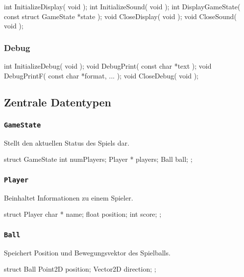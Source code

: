 \documentclass{homework-pp}
\renewcommand{\c}[1]{\lstinline[language=c,basicstyle=\ttfamily]|#1|}
\begin{document}
\begin{cblock}
int InitializeDisplay( void );
int InitializeSound( void );
int DisplayGameState( const struct GameState *state );
void CloseDisplay( void );
void CloseSound( void );
\end{cblock}

\subsubsection{Debug}

\begin{cblock}
int InitializeDebug( void );
void DebugPrint( const char *text );
void DebugPrintF( const char *format, ... );
void CloseDebug( void );
\end{cblock}

\subsection{Zentrale Datentypen}

\subsubsection{\c{GameState}}

Stellt den aktuellen Status des Spiels dar.

\begin{cblock}
struct GameState {
	int			numPlayers;
	Player *	players;
	Ball		ball;
};
\end{cblock}

\subsubsection{\c{Player}}

Beinhaltet Informationen zu einem Spieler.

\begin{cblock}
struct Player {
	char *	name;
	float	position;
	int		score;
};
\end{cblock}

\subsubsection{\c{Ball}}

Speichert Position und Bewegungsvektor des Spielballs.

\begin{cblock}
struct Ball {
	Point2D		position;
	Vector2D	direction;
};
\end{cblock}
\end{document}
